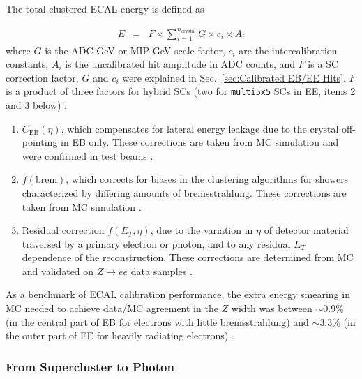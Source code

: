 \documentclass[dissertation.tex]{subfiles}
\begin{document}
The total clustered ECAL energy is defined as

\begin{eqnarray}
E &=& F \times \sum_{i=1}^{n_{\mathrm{crystal}}} G \times c_{i} \times A_{i}
\end{eqnarray}
%
where $G$ is the ADC-GeV or MIP-GeV scale factor, $c_{i}$ are the intercalibration constants, $A_{i}$ is the uncalibrated hit amplitude in ADC counts, and $F$ is a SC correction factor.  $G$ and $c_{i}$ were explained in Sec.~\ref{sec:Calibrated EB/EE Hits}.  $F$ is a product of three factors for hybrid SCs (two for \verb+multi5x5+ SCs in EE, items 2 and 3 below) \cite{ECAL_SC_note}:

\begin{enumerate}
  \item $C_{\mathrm{EB}}(\eta)$, which compensates for lateral energy leakage due to the crystal off-pointing in EB only.  These corrections are taken from MC simulation \cite{ECAL_SC_note} and were confirmed in test beams \cite{EB_startup_intercalibration}.
  \item $f(\mbox{brem})$, which corrects for biases in the clustering algorithms for showers characterized by differing amounts of bremsstrahlung.  These corrections are taken from MC simulation \cite{ECAL_SC_note}.
  \item Residual correction $f(E_{T}, \eta)$, due to the variation in $\eta$ of detector material traversed by a primary electron or photon, and to any residual $E_{T}$ dependence of the reconstruction.  These corrections are determined from MC and validated on $Z\rightarrow ee$ data samples \cite{ECALEnergyScaleCorrections_Twiki}.\marginpar{\textcolor{blue}{Changed}}
\end{enumerate}

As a benchmark of ECAL calibration performance, the extra energy smearing in MC needed to achieve data/MC agreement in the $Z$ width was between $\sim$0.9\% (in the central part of EB for electrons with little bremsstrahlung) and $\sim$3.3\% (in the outer part of EE for heavily radiating electrons) \cite{Higgs_note}.

\subsubsection{From Supercluster to Photon}
\label{sec:From Supercluster to Photon}
\end{document}

